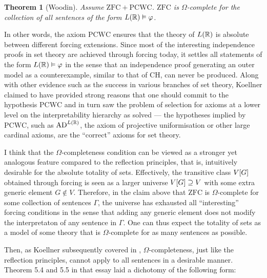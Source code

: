 \documentclass[12pt]{article}
\theoremstyle{plain}
\newtheorem{theorem}{Theorem}[section]
\theoremstyle{definition}
\newcommand{\ZFC}{\mathrm{ZFC}}
\newcommand{\CH}{\mathrm{CH}}
\newcommand{\PCWC}{\mathrm{PCWC}}
\newcommand{\AD}{\mathrm{AD}}
\begin{document}
\begin{theorem}[Woodin]
	Assume $\ZFC + \PCWC$. $\ZFC$ is $\Omega$-complete for the collection of all sentences of the form $L\mleft(\mathbb{R}\mright) \vDash \varphi$.
\end{theorem}

In other words, the axiom $\PCWC$ ensures that the theory of $L\mleft(\mathbb{R}\mright)$ is absolute between different forcing extensions. Since most of the interesting independence proofs in set theory are achieved through forcing today, it settles all statements of the form $L\mleft(\mathbb{R}\mright) \vDash \varphi$ in the sense that an independence proof generating an outer model as a counterexample, similar to that of $\CH$, can never be produced. Along with other evidence such as the success in various branches of set theory, Koellner claimed to have provided strong reasons that one should commit to the hypothesis $\PCWC$ and in turn saw the problem of selection for axioms at a lower level on the interpretability hierarchy as solved --- the hypotheses implied by $\PCWC$, such as $\AD^{L\mleft(\mathbb{R}\mright)}$, the axiom of projective uniformisation or other large cardinal axioms, are the ``correct'' axioms for set theory.

I think that the $\Omega$-completeness condition can be viewed as a stronger yet analogous feature compared to the reflection principles, that is, intuitively desirable for the absolute totality of sets. Effectively, the transitive class $V\mleft[G\mright]$ obtained through forcing is seen as a larger universe $V\mleft[G\mright] \supseteq V$ with some extra generic element $G \not\in V$. Therefore, in the claim above that $\ZFC$ is $\Omega$-complete for some collection of sentences $\Gamma$, the universe has exhausted all ``interesting'' forcing conditions in the sense that adding any generic element does not modify the interpretaton of any sentence in $\Gamma$. One can thus expect the totality of sets as a model of some theory that is $\Omega$-complete for as many sentences as possible.

Then, as Koellner subsequently covered in \cite{koellner-pluralism}, $\Omega$-completeness, just like the reflection principles, cannot apply to all sentences in a desirable manner. Theorem 5.4 and 5.5 in that essay laid a dichotomy of the following form:
\end{document}

